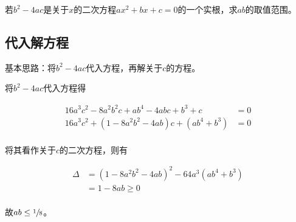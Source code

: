 

若$b^2 - 4ac$是关于$x$的二次方程$ax^2 + bx + c = 0$的一个实根，求$ab$的取值范围。


\subsection{代入解方程}

基本思路：将$b^2 - 4ac$代入方程，再解关于$c$的方程。

将$b^2 - 4ac$代入方程得

\begin{align*}
  16a^3c^2 - 8a^2b^2c + ab^4 - 4abc + b^3 + c &= 0 \\
  16a^3c^2 + (1 - 8a^2b^2 - 4ab)c + (ab^4 + b^3) &= 0 \\
\end{align*}

将其看作关于$c$的二次方程，则有

\begin{align*}
  \Delta &= (1 - 8a^2b^2 - 4ab)^2 - 64a^3(ab^4 + b^3) \\
  &= 1 - 8ab \ge0 \\
\end{align*}

故$ab \le\sfrac18$。
